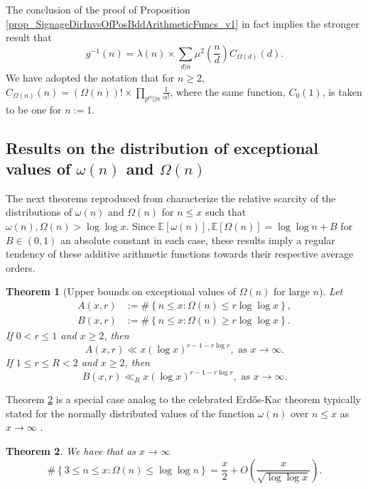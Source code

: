 \documentclass[11pt,reqno,a4letter]{article}
\numberwithin{figure}{section}
\numberwithin{table}{section}
\newcommand{\cf}{\textit{cf.\ }}
\theoremstyle{plain}
\newtheorem{theorem}{Theorem}
\numberwithin{theorem}{section}
\theoremstyle{definition}
\begin{document}
The conclusion of the proof of 
Proposition \ref{prop_SignageDirInvsOfPosBddArithmeticFuncs_v1} 
in fact implies the stronger result that 
\[
g^{-1}(n) = \lambda(n) \times \sum_{d|n} \mu^2\left(\frac{n}{d}\right) C_{\Omega(d)}(d).  
\]
We have adopted the notation that for $n \geq 2$, 
$C_{\Omega(n)}(n) = (\Omega(n))! \times \prod_{p^{\alpha} || n} \frac{1}{\alpha!}$, 
where the same function, $C_0(1)$, is taken to be one for $n := 1$. 

\subsection{Results on the distribution of exceptional values of $\omega(n)$ and $\Omega(n)$} 

The next theorems reproduced from \cite[\S 7.4]{MV} characterize the relative 
scarcity of the distributions of $\omega(n)$ and $\Omega(n)$ for $n \leq x$ such that 
$\omega(n),\Omega(n) > \log\log x$. 
Since $\mathbb{E}[\omega(n)],\mathbb{E}[\Omega(n)] = \log\log n + B$ for $B \in (0, 1)$ 
an absolute constant in each case, 
these results imply a regular tendency 
of these additive arithmetic functions towards their respective average orders. 

\begin{theorem}[Upper bounds on exceptional values of $\Omega(n)$ for large $n$] 
\label{theorem_MV_Thm7.20-init_stmt} 
Let 
\begin{align*} 
A(x, r) & := \#\left\{n \leq x: \Omega(n) \leq r \log\log x\right\}, \\ 
B(x, r) & := \#\left\{n \leq x: \Omega(n) \geq r \log\log x\right\}. 
\end{align*} 
If $0 < r \leq 1$ and $x \geq 2$, then 
\[
A(x, r) \ll x (\log x)^{r-1 - r\log r}, \text{ \ as\ } x \rightarrow \infty. 
\]
If $1 \leq r \leq R < 2$ and $x \geq 2$, then 
\[
B(x, r) \ll_R x (\log x)^{r-1-r \log r}, \text{ \ as\ } x \rightarrow \infty. 
\]
\end{theorem} 

Theorem \ref{theorem_MV_Thm7.21-init_stmt} is a special case analog to the 
celebrated Erd\H{o}s-Kac theorem typically stated for the 
normally distributed values of the function $\omega(n)$ over $n \leq x$ as 
$x \rightarrow \infty$ \cite[\cf Thm.\ 7.21]{MV} \cite[\cf \S 1.7]{IWANIEC-KOWALSKI}. 

\begin{theorem}
\label{theorem_MV_Thm7.21-init_stmt} 
We have that as $x \rightarrow \infty$ 
\[
\#\left\{3 \leq n \leq x: \Omega(n) \leq \log\log n \right\} = 
     \frac{x}{2} + O\left(\frac{x}{\sqrt{\log\log x}}\right). 
\]
\end{theorem} 
\end{document}
